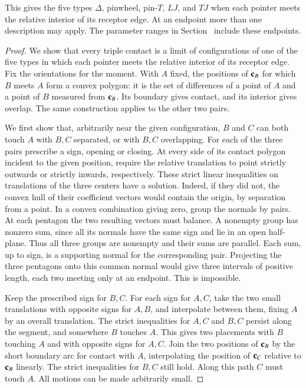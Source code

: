 This gives the five types $\Delta$, pinwheel, pin-$T$, $LJ$, and $TJ$
when each pointer meets the relative interior of its receptor edge.
At an endpoint more than one description may apply. The parameter
ranges in Section~ include these endpoints.

\begin{proof}
We show that every triple contact is a limit of configurations of one
of the five types in which each pointer meets the relative interior
of its receptor edge. Fix the orientations for the moment. With $A$ fixed, the positions of
${\mathbf c}_B$ for which $B$ meets $A$ form a convex polygon: it is the set
of differences of a point of $A$ and a point of $B$ measured from
${\mathbf c}_B$. Its boundary gives contact, and its interior gives overlap.
The same construction applies to the other two pairs.

We first show that, arbitrarily near the given configuration, $B$ and
$C$ can both touch $A$ with $B,C$ separated, or with $B,C$ overlapping.
For each of the three pairs prescribe a sign, opening or closing.
At every side of its contact polygon incident to the given position,
require the relative translation to point strictly outwards or strictly
inwards, respectively. These strict linear inequalities on translations
of the three centers have a solution. Indeed, if they did not, the
convex hull of their coefficient vectors would contain the origin, by
separation from a point. In a convex combination giving zero, group
the normals by pairs. At each pentagon the two resulting vectors must
balance. A nonempty group has nonzero sum, since all its normals have
the same sign and lie in an open half-plane. Thus all three groups
are nonempty and their sums are parallel. Each sum, up to sign, is a
supporting normal for the corresponding pair. Projecting the three
pentagons onto this common normal would give three intervals of
positive length, each two meeting only at an endpoint. This is
impossible.

Keep the prescribed sign for $B,C$. For each sign for $A,C$, take
the two small translations with opposite signs for $A,B$, and
interpolate between them, fixing $A$ by an overall translation.
The strict inequalities for $A,C$ and $B,C$ persist along the segment,
and somewhere $B$ touches $A$. This gives two placements with $B$
touching $A$ and with opposite signs for $A,C$. Join the two positions
of ${\mathbf c}_B$ by the short boundary arc for contact with $A$, interpolating
the position of ${\mathbf c}_C$ relative to ${\mathbf c}_B$ linearly. The strict
inequalities for $B,C$ still hold. Along this path $C$ must touch $A$.
All motions can be made arbitrarily small.


\end{proof}
